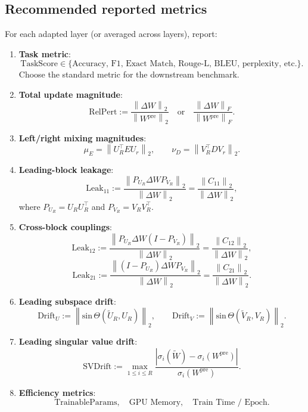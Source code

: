 \documentclass[11pt]{article}
\newcommand{\fro}[1]{\left\|#1\right\|_F}
\newcommand{\op}[1]{\left\|#1\right\|_2}
\newcommand{\sinTheta}{\mathrm{sin}\,\Theta}
\begin{document}
\subsection{Recommended reported metrics}

For each adapted layer (or averaged across layers), report:

\begin{enumerate}[label=\arabic*.,leftmargin=2em]
    \item \textbf{Task metric}:
    \[
    \text{TaskScore}
    \in
    \{\text{Accuracy, F1, Exact Match, Rouge-L, BLEU, perplexity, etc.}\}.
    \]
    Choose the standard metric for the downstream benchmark.

    \item \textbf{Total update magnitude}:
    \[
    \mathrm{RelPert}
    :=
    \frac{\op{\Delta W}}{\op{W^{\mathrm{pre}}}}
    \quad\text{or}\quad
    \frac{\fro{\Delta W}}{\fro{W^{\mathrm{pre}}}}.
    \]

    \item \textbf{Left/right mixing magnitudes}:
    \[
    \mu_E = \op{U_R^\top E U_r},
    \qquad
    \nu_D = \op{V_R^\top D V_r}.
    \]

    \item \textbf{Leading-block leakage}:
    \[
    \mathrm{Leak}_{11}
    :=
    \frac{\op{P_{U_R}\Delta W P_{V_R}}}{\op{\Delta W}}
    =
    \frac{\op{C_{11}}}{\op{\Delta W}},
    \]
    where \(P_{U_R}=U_RU_R^\top\) and \(P_{V_R}=V_RV_R^\top\).

    \item \textbf{Cross-block couplings}:
    \[
    \mathrm{Leak}_{12}
    :=
    \frac{\op{P_{U_R}\Delta W (I-P_{V_R})}}{\op{\Delta W}}
    =
    \frac{\op{C_{12}}}{\op{\Delta W}},
    \]
    \[
    \mathrm{Leak}_{21}
    :=
    \frac{\op{(I-P_{U_R})\Delta W P_{V_R}}}{\op{\Delta W}}
    =
    \frac{\op{C_{21}}}{\op{\Delta W}}.
    \]

    \item \textbf{Leading subspace drift}:
    \[
    \mathrm{Drift}_U := \op{\sinTheta(\widetilde U_R,U_R)},
    \qquad
    \mathrm{Drift}_V := \op{\sinTheta(\widetilde V_R,V_R)}.
    \]

    \item \textbf{Leading singular value drift}:
    \[
    \mathrm{SVDrift}
    :=
    \max_{1\le i\le R}
    \frac{\left|\sigma_i(\widetilde W)-\sigma_i(W^{\mathrm{pre}})\right|}
    {\sigma_i(W^{\mathrm{pre}})}.
    \]

    \item \textbf{Efficiency metrics}:
    \[
    \text{TrainableParams},\quad \text{GPU Memory},\quad \text{Train Time / Epoch}.
    \]
\end{enumerate}
\end{document}
